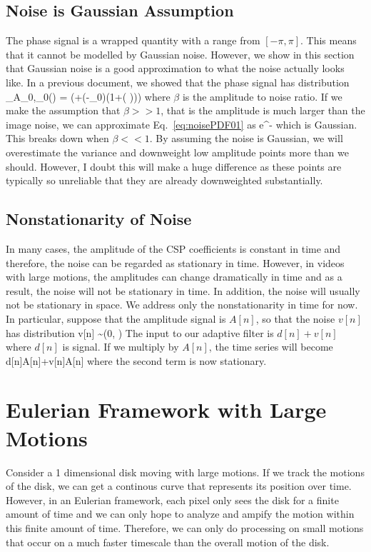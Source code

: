 \documentclass[letterpaper, 10pt]{article}
\numberwithin{equation}{section}
\begin{document}
\subsection{Noise is Gaussian Assumption}
The phase signal is a wrapped quantity with a range from $[-\pi,\pi]$. This means that it cannot be modelled by Gaussian noise. However, we show in this section that Gaussian noise is a good approximation to what the noise actually looks like. In a previous document, we showed that the phase signal has distribution 
\beq {}_{A_0,\theta_0}(\theta) =  \left(+\beta\cos(\theta-\theta_0)\left(1+\left( \right)\right)\right) \label{eq:noisePDF01}\eeq
where $\beta$ is the amplitude to noise ratio. If we make the assumption that $\beta >>1$, that is the amplitude is much larger than the image noise, we can approximate Eq.~\ref{eq:noisePDF01} as
\beq \frac{\beta}{\sqrt{2\pi}} e^{-}\eeq
which is Gaussian. This breaks down when $\beta<<1$. By assuming the noise is Gaussian, we will overestimate the variance and downweight low amplitude points more than we should. However, I doubt this will make a huge difference as these points are typically so unreliable that they are already downweighted substantially.


\subsection{Nonstationarity of Noise}
In many cases, the amplitude of the CSP coefficients is constant in time and therefore, the noise can be regarded as stationary in time. However, in videos with large motions, the amplitudes can change dramatically in time and as a result, the noise will not be stationary in time. In addition, the noise will usually not be stationary in space. We address only the nonstationarity in time for now. In particular, suppose that the amplitude signal is $A[n]$, so that the noise $v[n]$ has distribution
\beq v[n] \sim{}\left(0, \right)\eeq
The input to our adaptive filter is $d[n]+v[n]$ where $d[n]$ is signal. If we multiply by $A[n]$, the time series will become 
\beq d[n]A[n]+v[n]A[n]\eeq
where the second term is now stationary. 

\section{Eulerian Framework with Large Motions}
Consider a 1 dimensional disk moving with large motions. If we track the motions of the disk, we can get a continous curve that represents its position over time. However, in an Eulerian framework, each pixel only sees the disk for a finite amount of time and we can only hope to analyze and ampify the motion within this finite amount of time. Therefore, we can only do processing on small motions that occur on a much faster timescale than the overall motion of the disk. 
\end{document}
